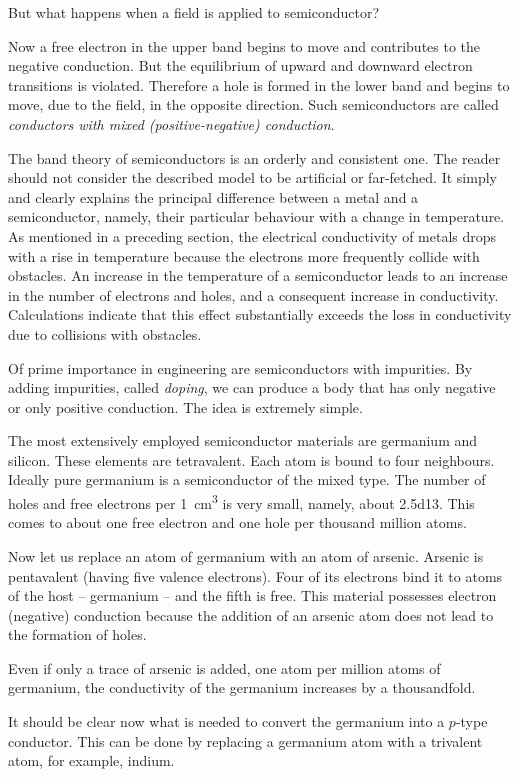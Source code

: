 But what happens when a field is applied to semiconductor?

Now a free electron in the upper band begins to move and contributes to the negative conduction. But the equilibrium of upward and downward electron transitions is violated. Therefore a hole is formed in the lower band and begins to move, due to the field, in the opposite direction. Such semiconductors are called \emph{conductors with mixed (positive-negative) conduction}.


The band theory of semiconductors is an orderly and consistent one. The reader should not consider the described model to be artificial or far-fetched. It simply and clearly explains the principal difference between a metal and a semiconductor, namely, their particular behaviour with a change in temperature. As mentioned
in a preceding section, the electrical conductivity of metals drops with a rise in temperature because the electrons more frequently collide with obstacles. An increase in the temperature of a semiconductor leads to an increase in the number of electrons and holes, and a consequent increase in conductivity. Calculations indicate that this effect substantially exceeds the loss in conductivity due to collisions with obstacles.

Of prime importance in engineering are semiconductors with impurities. By adding impurities, called \emph{doping}, we can produce a body that has only negative or only positive conduction. The idea is extremely simple.

The most extensively employed semiconductor materials are germanium and silicon. These elements are tetravalent. Each atom is bound to four neighbours. Ideally pure germanium is a semiconductor of the mixed type. The number of holes and free electrons per \SI{1}{\centi\meter\cubed} is very small, namely, about \num{2.5d13}. This comes to about one free electron and one hole per thousand million atoms.


Now let us replace an atom of germanium with an atom of arsenic. Arsenic is pentavalent (having five valence electrons). Four of its electrons bind it to atoms of the host -- germanium -- and the fifth is free. This material possesses electron (negative) conduction because the addition of an arsenic atom does not lead to the formation of holes.

Even if only a trace of arsenic is added, one atom per million atoms of germanium, the conductivity of the germanium increases by a thousandfold.

It should be clear now what is needed to convert the germanium into a $p$-type conductor. This can be done by replacing a germanium atom with a trivalent atom, for example, indium.

